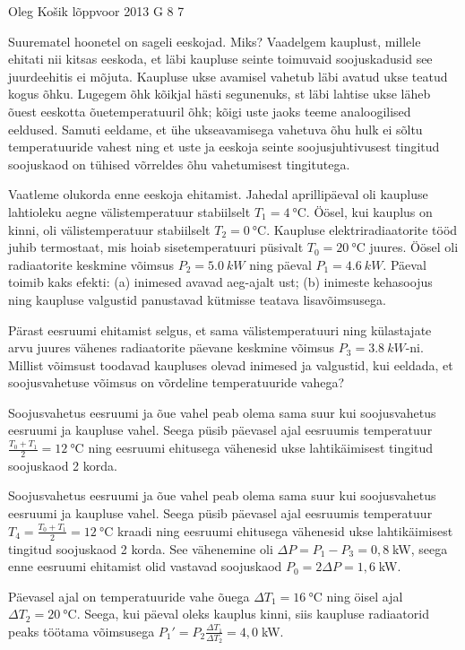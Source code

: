 {Oleg Košik} %
{lõppvoor} %
{2013} %
{G 8} %
{7} %
{
\ifStatement
Suurematel hoonetel on sageli eeskojad. Miks? 
Vaadelgem kauplust, millele ehitati nii kitsas eeskoda, et
läbi kaupluse seinte toimuvaid soojuskadusid see juurdeehitis ei
mõjuta. Kaupluse ukse avamisel vahetub läbi avatud ukse teatud kogus õhku.
Lugegem õhk kõikjal hästi segunenuks, st läbi lahtise
ukse läheb õuest eeskotta õuetemperatuuril õhk; kõigi uste jaoks teeme
analoogilised eeldused. Samuti
eeldame, et ühe
ukseavamisega vahetuva õhu hulk ei sõltu temperatuuride vahest  ning et uste ja
eeskoja seinte soojusjuhtivusest tingitud soojuskaod on tühised võrreldes õhu
vahetumisest tingitutega.

Vaatleme olukorda enne eeskoja ehitamist. Jahedal aprillipäeval oli kaupluse
lahtioleku aegne välistemperatuur stabiilselt $T_1=\SI{4}{\celsius}$. Öösel, kui kauplus
on kinni, oli välistemperatuur stabiilselt $T_2=\SI{0}{\celsius}$. Kaupluse
elektriradiaatorite tööd juhib termostaat, mis hoiab sisetemperatuuri püsivalt
$T_0=\SI{20}{\celsius}$ juures.
Öösel oli radiaatorite keskmine võimsus $P_2= \SI{5,0}{kW}$
ning päeval $P_1=\SI{4,6}{kW}$. Päeval toimib kaks efekti: (a) inimesed avavad
aeg-ajalt ust; (b) inimeste kehasoojus ning kaupluse valgustid panustavad
kütmisse teatava lisavõimsusega. 

Pärast eesruumi ehitamist selgus, et sama välistemperatuuri ning
külastajate arvu juures vähenes radiaatorite päevane keskmine võimsus
\mbox{$P_3=\SI{3,8}{kW}$-ni.} Millist võimsust toodavad kaupluses olevad
inimesed ja valgustid, kui eeldada, et soojusvahetuse võimsus on võrdeline
temperatuuride vahega? 
\fi


\ifHint
Soojusvahetus eesruumi ja õue vahel peab olema sama suur kui soojusvahetus eesruumi ja kaupluse vahel. Seega püsib päevasel ajal eesruumis  temperatuur $\frac{T_0+T_1}{2}=\SI{12}{\celsius}$ ning eesruumi ehitusega vähenesid ukse lahtikäimisest tingitud soojuskaod 2 korda.
\fi


\ifSolution
Soojusvahetus eesruumi ja õue vahel peab olema sama suur kui soojusvahetus eesruumi ja kaupluse vahel. Seega püsib päevasel ajal eesruumis  temperatuur $T_4=\frac{T_0+T_1}{2}=\SI{12}{\celsius}$ kraadi ning eesruumi ehitusega vähenesid ukse lahtikäimisest tingitud soojuskaod 2 korda. See vähenemine oli $\Delta P=P_1-P_3=0,8\;$kW, seega enne eesruumi ehitamist olid vastavad soojuskaod $P_0=2\Delta P=1,6\;$kW.

Päevasel ajal on temperatuuride vahe õuega $\Delta T_1=\SI{16}{\celsius}$ ning öisel ajal $\Delta T_2=\SI{20}{\celsius}$. Seega, kui päeval oleks kauplus kinni, siis kaupluse radiaatorid peaks töötama võimsusega $P_1'=P_2\frac{\Delta T_1}{\Delta T_2}=4,0\;$kW.

}
